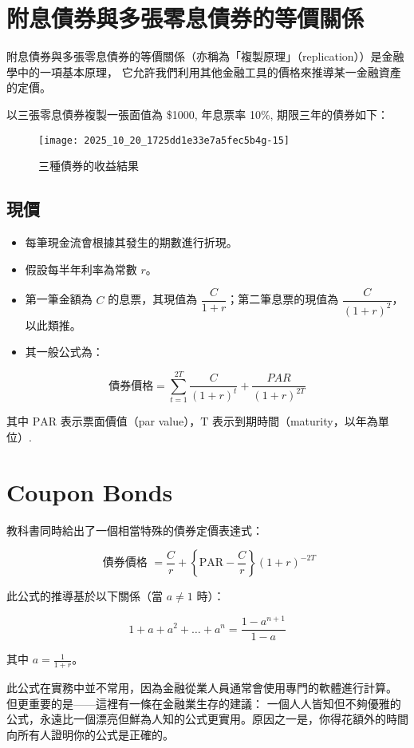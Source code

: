 \documentclass[letterpaper]{article}
\begin{document}
\section*{附息債券與多張零息債券的等價關係}

附息債券與多張零息債券的等價關係（亦稱為「複製原理」（replication））是金融學中的一項基本原理， 它允許我們利用其他金融工具的價格來推導某一金融資產的定價。

以三張零息債券複製一張面值為 \$1000, 年息票率 10\%, 期限三年的債券如下：


\begin{figure}[h]
\begin{center}
  \texttt{[image: 2025\_10\_20\_1725dd1e33e7a5fec5b4g-15]}
\caption{三種債券的收益結果}
\end{center}
\end{figure}

\subsection{現價}
\begin{itemize}
	\item 每筆現金流會根據其發生的期數進行折現。
	\item 假設每半年利率為常數 \( r \)。
	\item 第一筆金額為 \( C \) 的息票，其現值為 \(\dfrac{C}{1 + r}\)；第二筆息票的現值為 \(\dfrac{C}{(1 + r)^{2}}\)，以此類推。
	\item 其一般公式為：
\end{itemize}

$$
\text {債券價格}=\sum_{t=1}^{2 T} \frac{C}{(1+r)^{t}}+\frac{P A R}{(1+r)^{2 T}}
$$

其中 \(\mathrm{PAR}\) 表示票面價值（par value），\(\mathrm{T}\) 表示到期時間（maturity，以年為單位）.

\section*{Coupon Bonds}
教科書同時給出了一個相當特殊的債券定價表達式：

$$
\text { 債券價格 }=\frac{C}{r}+\left\{\mathrm{PAR}-\frac{C}{r}\right\}(1+r)^{-2 T}
$$

此公式的推導基於以下關係（當 \( a \neq 1 \) 時）：

\[
1 + a + a^{2} + \ldots + a^{n} = \frac{1 - a^{n+1}}{1 - a}
\]

其中 \( a = \frac{1}{1 + r} \)。

此公式在實務中並不常用，因為金融從業人員通常會使用專門的軟體進行計算。  
但更重要的是——這裡有一條在金融業生存的建議： 一個人人皆知但不夠優雅的公式，永遠比一個漂亮但鮮為人知的公式更實用。原因之一是，你得花額外的時間向所有人證明你的公式是正確的。
\end{document}
